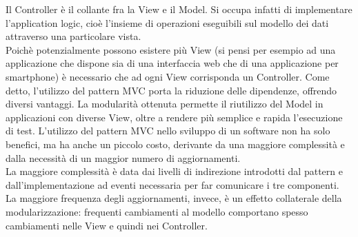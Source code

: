 				Il Controller è il collante fra la View e il Model. Si occupa infatti di implementare l'application logic, cioè l'insieme di operazioni eseguibili sul modello dei dati attraverso una particolare vista.\\
				Poichè potenzialmente possono esistere più View (si pensi per esempio ad una applicazione che dispone sia di una interfaccia web che di una applicazione per smartphone) è necessario che ad ogni View corrisponda un Controller.
			Come detto, l'utilizzo del pattern MVC porta la riduzione delle dipendenze, offrendo diversi vantaggi. La modularità ottenuta permette il riutilizzo del Model in applicazioni con diverse View, oltre a rendere più semplice e rapida l'esecuzione di test. 
			L'utilizzo del pattern MVC nello sviluppo di un software non ha solo benefici, ma ha anche un piccolo costo, derivante da una maggiore complessità e dalla necessità di un maggior numero di aggiornamenti.\\
  			La maggiore complessità è data dai livelli di indirezione introdotti dal pattern e dall'implementazione ad eventi necessaria per far comunicare i tre componenti. La maggiore frequenza degli aggiornamenti, invece, è un effetto collaterale della modularizzazione: frequenti cambiamenti al modello comportano spesso cambiamenti nelle View e quindi nei Controller.